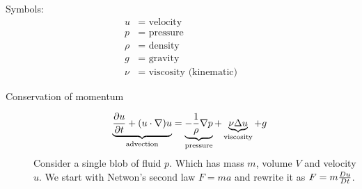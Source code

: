 \begin{multicols}{2}
Symbols:
\begin{align*}
 u &= \text{ velocity}\\
 p &= \text{ pressure}\\
 \rho &= \text{ density}\\
 g &= \text{ gravity}\\
 \nu &= \text{ viscosity (kinematic)}
\end{align*}

\begin{description}
	\item[Conservation of momentum]
		\begin{align*}
			\underbrace{{\partial u \over \partial t} + (u \cdot \nabla) u}_\text{advection}
				&= 
			\underbrace{-{1\over \rho}\nabla p}_\text{pressure} +
			\underbrace{\nu \Delta u}_\text{viscosity} + g
		\end{align*}
		Consider a single blob of fluid $p$. Which has mass $m$, volume $V$ and velocity $u$. We start with Netwon's  second law $F = ma$ and rewrite it as $F =  m {Du \over Dt}$.\\
		

\end{description}
\end{multicols}
